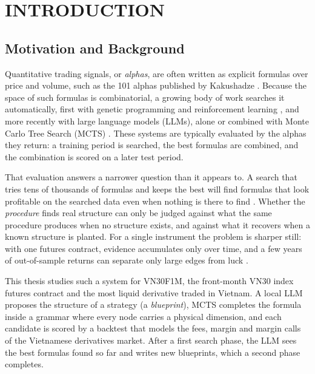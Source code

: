 \documentclass[12pt,a4paper,oneside]{book}
\theoremstyle{definition}
\begin{document}
\clearpage

\chapter{INTRODUCTION}
\label{ch1}

\section{Motivation and Background}

Quantitative trading signals, or \emph{alphas}, are often written as explicit formulas over price and volume, such as the 101 alphas published by Kakushadze \cite{kakushadze2016}. Because the space of such formulas is combinatorial, a growing body of work searches it automatically, first with genetic programming \cite{koza1992} and reinforcement learning \cite{yu2023,xu2024}, and more recently with large language models (LLMs), alone \cite{wang2023,tang2025} or combined with Monte Carlo Tree Search (MCTS) \cite{ren2024,shi2026}. These systems are typically evaluated by the alphas they return: a training period is searched, the best formulas are combined, and the combination is scored on a later test period.

That evaluation answers a narrower question than it appears to. A search that tries tens of thousands of formulas and keeps the best will find formulas that look profitable on the searched data even when nothing is there to find \cite{white2000,harvey2015,harvey2016}. Whether the \emph{procedure} finds real structure can only be judged against what the same procedure produces when no structure exists, and against what it recovers when a known structure is planted. For a single instrument the problem is sharper still: with one futures contract, evidence accumulates only over time, and a few years of out-of-sample returns can separate only large edges from luck \cite{lo2002}.

This thesis studies such a system for VN30F1M, the front-month VN30 index futures contract and the most liquid derivative traded in Vietnam. A local LLM proposes the structure of a strategy (a \emph{blueprint}), MCTS completes the formula inside a grammar where every node carries a physical dimension, and each candidate is scored by a backtest that models the fees, margin and margin calls of the Vietnamese derivatives market. After a first search phase, the LLM sees the best formulas found so far and writes new blueprints, which a second phase completes.
\end{document}
